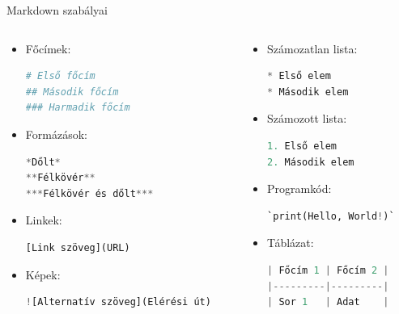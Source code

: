 \documentclass[english, aspectratio=169]{beamer}
\begin{document}
	\begin{frame}[fragile]{Markdown szabályai}
		\begin{columns}
			\begin{column}{.5\textwidth}
				\begin{itemize}
					\item Főcímek:
					\begin{lstlisting}[language=python]
# Első főcím
## Második főcím
### Harmadik főcím
					\end{lstlisting}
					\item Formázások:
					\begin{lstlisting}[language=python]
*Dőlt*
**Félkövér**
***Félkövér és dőlt***
					\end{lstlisting}
					\item Linkek:
					\begin{lstlisting}[language=python]
[Link szöveg](URL)
					\end{lstlisting}
					\item Képek:
					\begin{lstlisting}[language=python]
![Alternatív szöveg](Elérési út)
					\end{lstlisting}
				\end{itemize}
			\end{column}
			\begin{column}{.5\textwidth}
				\begin{itemize}
					\item Számozatlan lista:
					\begin{lstlisting}[language=python]
* Első elem
* Második elem
					\end{lstlisting}
					\item Számozott lista: 
					\begin{lstlisting}[language=python]
1. Első elem
2. Második elem
					\end{lstlisting}
					\item Programkód:
					\begin{lstlisting}[language=python]
`print(Hello, World!)`
					\end{lstlisting}
					\item Táblázat:
					\begin{lstlisting}[language=python]
| Főcím 1 | Főcím 2 |
|---------|---------|
| Sor 1   | Adat    |
					\end{lstlisting}
				\end{itemize}
			\end{column}
		\end{columns}
	\end{frame}
	
\end{document}
